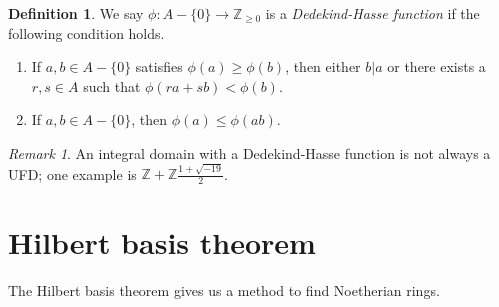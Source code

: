 \documentclass[12pt]{report}
\theoremstyle{plain}
\theoremstyle{remark}
\newtheorem*{remark}{Remark}
\theoremstyle{definition}
\newtheorem{definition}[theorem]{Definition}
\newcommand{\Z}{\mathbb{Z}}
\begin{document}
\begin{definition}
    We say $\phi:A-\{0\}\rightarrow\Z_{\ge 0}$ is a \emph{Dedekind-Hasse function} if the following condition holds.
    \begin{enumerate}
        \item If $a,b\in A-\{0\}$ satisfies $\phi(a)\ge \phi(b)$, then either $b|a$ or there exists a $r,s\in A$ such that $\phi(ra+sb)<\phi(b)$.
        \item If $a,b\in A-\{0\}$, then $\phi(a)\le \phi(ab)$.
    \end{enumerate}
\end{definition}
\begin{remark}
    An integral domain with a Dedekind-Hasse function is not always a UFD; one example is $\Z+\Z\frac{1+\sqrt{-19}}{2}$.
\end{remark}


\clearpage
\section{Hilbert basis theorem}
The Hilbert basis theorem gives us a method to find Noetherian rings.
\end{document}
